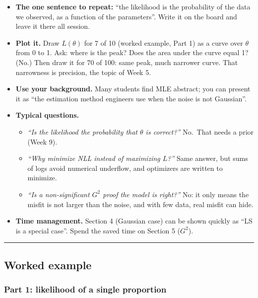\begin{itemize}
\tightlist
\item
  \textbf{The one sentence to repeat:} ``the likelihood is the
  probability of the data we observed, as a function of the
  parameters''. Write it on the board and leave it there all session.
\item
  \textbf{Plot it.} Draw \(L(\theta)\) for 7 of 10 (worked example, Part
  1) as a curve over \(\theta\) from 0 to 1. Ask: where is the peak?
  Does the area under the curve equal 1? (No.) Then draw it for 70 of
  100: same peak, much narrower curve. That narrowness is precision, the
  topic of Week 5.
\item
  \textbf{Use your background.} Many students find MLE abstract; you can
  present it as ``the estimation method engineers use when the noise is
  not Gaussian''.
\item
  \textbf{Typical questions.}

  \begin{itemize}
  \tightlist
  \item
    \emph{``Is the likelihood the probability that \(\theta\) is
    correct?''} No.~That needs a prior (Week 9).
  \item
    \emph{``Why minimize NLL instead of maximizing \(L\)?''} Same
    answer, but sums of logs avoid numerical underflow, and optimizers
    are written to minimize.
  \item
    \emph{``Is a non-significant \(G^2\) proof the model is right?''}
    No: it only means the misfit is not larger than the noise, and with
    few data, real misfit can hide.
  \end{itemize}
\item
  \textbf{Time management.} Section 4 (Gaussian case) can be shown
  quickly as ``LS is a special case''. Spend the saved time on Section 5
  (\(G^2\)).
\end{itemize}

\begin{center}\rule{0.5\linewidth}{0.5pt}\end{center}


\subsection{Worked example}

\subsubsection{Part 1: likelihood of a single proportion}

